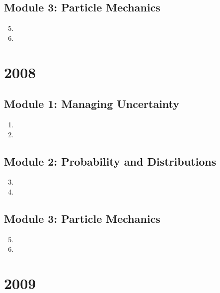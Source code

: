 \documentclass[fleqn,titlepage]{book}
\numberwithin{equation}{section}
\theoremstyle{plain}
\theoremstyle{definition}
\theoremstyle{remark}
\begin{document}
\section{Module 3: Particle Mechanics}
\begin{enumerate}[label=\bfseries  \arabic*.]\setcounter{enumi}{4}
\item 
\item 
\end{enumerate}

\chapter{2008}
\section{Module 1: Managing Uncertainty}
\begin{enumerate}[label=\bfseries  \arabic*.]\setcounter{enumi}{0}
\item 
\item 
\end{enumerate}
\section{Module 2: Probability and Distributions}
\begin{enumerate}[label=\bfseries  \arabic*.]\setcounter{enumi}{2}
\item 
\item 
\end{enumerate}
\section{Module 3: Particle Mechanics}
\begin{enumerate}[label=\bfseries  \arabic*.]\setcounter{enumi}{4}
\item 
\item 
\end{enumerate}


\chapter{2009}
\end{document}
